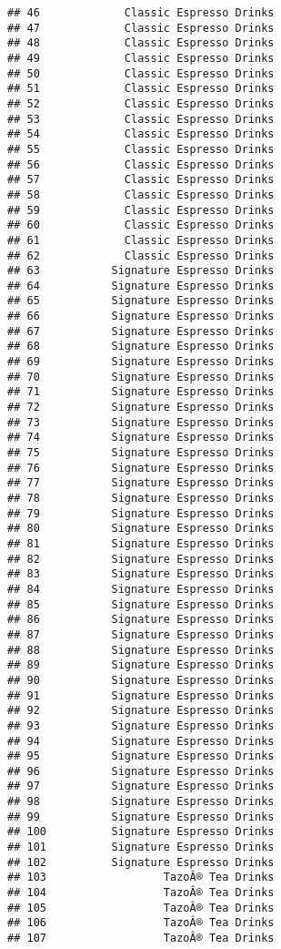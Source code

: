 \documentclass[
]{article}
\begin{document}
\begin{verbatim}
## 46             Classic Espresso Drinks
## 47             Classic Espresso Drinks
## 48             Classic Espresso Drinks
## 49             Classic Espresso Drinks
## 50             Classic Espresso Drinks
## 51             Classic Espresso Drinks
## 52             Classic Espresso Drinks
## 53             Classic Espresso Drinks
## 54             Classic Espresso Drinks
## 55             Classic Espresso Drinks
## 56             Classic Espresso Drinks
## 57             Classic Espresso Drinks
## 58             Classic Espresso Drinks
## 59             Classic Espresso Drinks
## 60             Classic Espresso Drinks
## 61             Classic Espresso Drinks
## 62             Classic Espresso Drinks
## 63           Signature Espresso Drinks
## 64           Signature Espresso Drinks
## 65           Signature Espresso Drinks
## 66           Signature Espresso Drinks
## 67           Signature Espresso Drinks
## 68           Signature Espresso Drinks
## 69           Signature Espresso Drinks
## 70           Signature Espresso Drinks
## 71           Signature Espresso Drinks
## 72           Signature Espresso Drinks
## 73           Signature Espresso Drinks
## 74           Signature Espresso Drinks
## 75           Signature Espresso Drinks
## 76           Signature Espresso Drinks
## 77           Signature Espresso Drinks
## 78           Signature Espresso Drinks
## 79           Signature Espresso Drinks
## 80           Signature Espresso Drinks
## 81           Signature Espresso Drinks
## 82           Signature Espresso Drinks
## 83           Signature Espresso Drinks
## 84           Signature Espresso Drinks
## 85           Signature Espresso Drinks
## 86           Signature Espresso Drinks
## 87           Signature Espresso Drinks
## 88           Signature Espresso Drinks
## 89           Signature Espresso Drinks
## 90           Signature Espresso Drinks
## 91           Signature Espresso Drinks
## 92           Signature Espresso Drinks
## 93           Signature Espresso Drinks
## 94           Signature Espresso Drinks
## 95           Signature Espresso Drinks
## 96           Signature Espresso Drinks
## 97           Signature Espresso Drinks
## 98           Signature Espresso Drinks
## 99           Signature Espresso Drinks
## 100          Signature Espresso Drinks
## 101          Signature Espresso Drinks
## 102          Signature Espresso Drinks
## 103                  TazoÂ® Tea Drinks
## 104                  TazoÂ® Tea Drinks
## 105                  TazoÂ® Tea Drinks
## 106                  TazoÂ® Tea Drinks
## 107                  TazoÂ® Tea Drinks

\end{verbatim}
\end{document}

